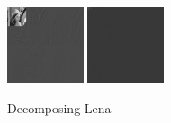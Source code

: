 \documentclass{beamer}
\def\RImageSize{0.2\textwidth}
\def\RImageSpace{\hspace{1cm}}
\begin{document}
\begin{frame}
\begin{figure}[hbt]
\begin{center}
    \end{center}
  \end{figure}
  \pause
  \begin{figure}[hbt]
    \begin{center}
      \includegraphics[width=\RImageSize]{lena-2step.jpg}
      \RImageSpace
      \pause
      \includegraphics[width=\RImageSize]{lena-9step.jpg}
      \caption{Decomposing Lena}
    \end{center}
  \end{figure}

\end{frame}
\end{document}
